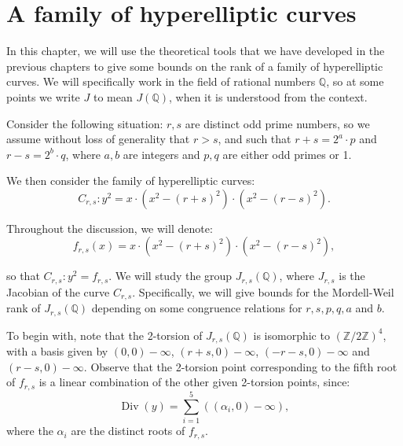 \documentclass[a4paper, 12pt]{amsart}
\theoremstyle{definition}
\theoremstyle{plain}
\theoremstyle{plain}
\theoremstyle{plain}
\theoremstyle{plain}
\theoremstyle{remark}
\theoremstyle{remark}
\theoremstyle{plain}
\newcommand{\Q}{\mathbb{Q}}
\newcommand{\Zmod}[1]{\mathbb{Z}/#1\mathbb{Z}}
\DeclareMathOperator{\Div}{Div}
\begin{document}
	
	
	
	
	
	
	
	
	
	
	
	
	
	
	
	
	
	\newpage
	\thispagestyle{plain}
	\section{A family of hyperelliptic curves}
	\markright{}
	In this chapter, we will use the theoretical tools that we have developed in the previous chapters to give some bounds on the rank of a family of hyperelliptic curves. We will specifically work in the field of rational numbers $\Q$, so at some points we write $J$ to mean $J(\Q)$, when it is understood from the context.
	
	
	Consider the following situation: $r,s$ are distinct odd prime numbers, so we assume without loss of generality that $r>s$, and such that $r+s=2^a\cdot p$ and $r-s=2^b\cdot q$, where $a,b$ are integers and $p,q$ are either odd primes or 1.
	
	We then consider the family of hyperelliptic curves:
	\begin{equation*}
		C_{r,s}: y^2=x\cdot(x^2-(r+s)^2)\cdot(x^2-(r-s)^2).
	\end{equation*}
	
	Throughout the discussion, we will denote:
	\begin{equation*}
		f_{r,s}(x)=x\cdot(x^2-(r+s)^2)\cdot(x^2-(r-s)^2),
	\end{equation*}
	
	so that $C_{r,s}:y^2=f_{r,s}$. We will study the group $J_{r,s}(\Q)$, where $J_{r,s}$ is the Jacobian of the curve $C_{r,s}$. Specifically, we will give bounds for the Mordell-Weil rank of $J_{r,s}(\Q)$ depending on some congruence relations for $r,s,p,q,a$ and $b$.
	
	To begin with, note that the 2-torsion of $J_{r,s}(\Q)$ is isomorphic to $(\Zmod{2})^4$, with a basis given by $(0,0)-\infty$, $(r+s,0)-\infty$, $(-r-s,0)-\infty$ and $(r-s,0)-\infty$. Observe that the 2-torsion point corresponding to the fifth root of $f_{r,s}$ is a linear combination of the other given 2-torsion points, since:
	\begin{equation*}
		\Div(y)=\sum_{i=1}^{5}((\alpha_i,0)-\infty),
	\end{equation*}
	where the $\alpha_i$ are the distinct roots of $f_{r,s}$.
	
\end{document}
